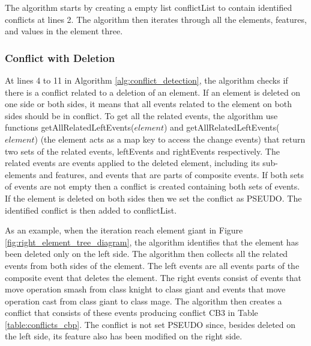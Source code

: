 The algorithm starts by creating a empty list \textsf{conflictList} to contain identified conflicts at lines 2. The algorithm then iterates through all the elements, features, and values in the element three. 

\subsubsection{Conflict with Deletion} 
\label{sec:delete_conflict} 
At lines 4 to 11 in Algorithm \ref{alg:conflict_detection}, the algorithm checks if there is a conflict related to a deletion of an element.
If an element is deleted on one side or both sides, it means that all events related to the element on both sides should be in conflict. 
To get all the related events, the algorithm use functions \textsf{getAllRelatedLeftEvents($element$)} 
and \textsf{getAllRelatedLeftEvents($element$)} (the element acts as a map key to access the change events) that return two sets of the related events, 
\textsf{leftEvents} and \textsf{rightEvents} respectively. The related events are events applied to the deleted element, including its sub-elements and features, 
and events that are parts of composite events. If both sets of events are not empty then a conflict is created containing both sets of events. 
If the element is deleted on both sides then we set the conflict as \textsf{PSEUDO}. The identified conflict is then added to \textsf{conflictList}.

As an example, when the iteration reach element \textsf{giant} in Figure \ref{fig:right_element_tree_diagram}, the algorithm identifies that the element has been deleted only on the left side.
The algorithm then collects all the related events from both sides of the element. 
The left events are all events parts of the composite event that deletes the element. 
The right events consist of events that move operation \textsf{smash} from class \textsf{knight} to class \textsf{giant} and events that
move operation \textsf{cast} from class \textsf{giant} to class \textsf{mage}. The algorithm then creates a conflict that consists of these events 
producing conflict \textsf{CB3} in Table \ref{table:conflicts_cbp}. The conflict is not set \textsf{PSEUDO} since, besides deleted on the left side, its feature also has been modified on the right side. 


